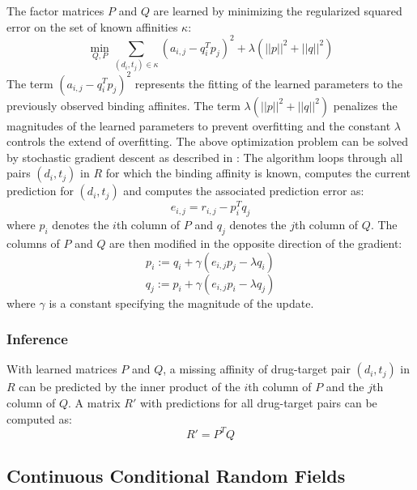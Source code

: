 The factor matrices $P$ and $Q$ are learned by minimizing the regularized squared error on the set of known affinities $\kappa$:
\begin{equation}
\min\limits_{Q,P}{\sum\limits_{(d_i,t_j)\in \kappa} (a_{i,j}-q_i^Tp_j)^2} + \lambda (||p||^2 + ||q||^2)
\end{equation}
The term $(a_{i,j}-q_i^Tp_j)^2$ represents the fitting of the learned parameters to the previously observed binding affinites. The term $\lambda (||p||^2 + ||q||^2)$ penalizes the magnitudes of the learned parameters to prevent overfitting and the constant $\lambda$ controls the extend of overfitting.
The above optimization problem can be solved by stochastic gradient descent as described in \cite{Koren:2009:MFT:1608565.1608614}:
The algorithm loops through all pairs $(d_i, t_j)$ in $R$ for which the binding affinity is known, computes the current prediction for $(d_i, t_j)$ and computes the associated prediction error as:
\begin{equation}
e_{i,j} = r_{i,j} - p_i^Tq_j
\end{equation}
where $p_i$ denotes the $i$th column of $P$ and $q_j$ denotes the $j$th column of $Q$. The columns of $P$ and $Q$ are then modified in the opposite direction of the gradient:
\begin{equation}
p_i:= q_i + \gamma (e_{i,j} p_j - \lambda q_i)
\end{equation}
\begin{equation}
q_j:=p_i + \gamma (e_{i,j} p_i - \lambda q_j)
\end{equation}
where $\gamma$ is a constant specifying the magnitude of the update.

\subsubsection{Inference}

With learned matrices $P$ and $Q$, a missing affinity of drug-target pair $(d_i, t_j)$ in $R$ can be predicted by the inner product of the $i$th column of $P$ and the $j$th column of $Q$. A matrix $R'$ with predictions for all drug-target pairs can be computed as:
\begin{equation}
R' = P^TQ
\end{equation}

\subsection{Continuous Conditional Random Fields}
\label{sec:CCRF}


